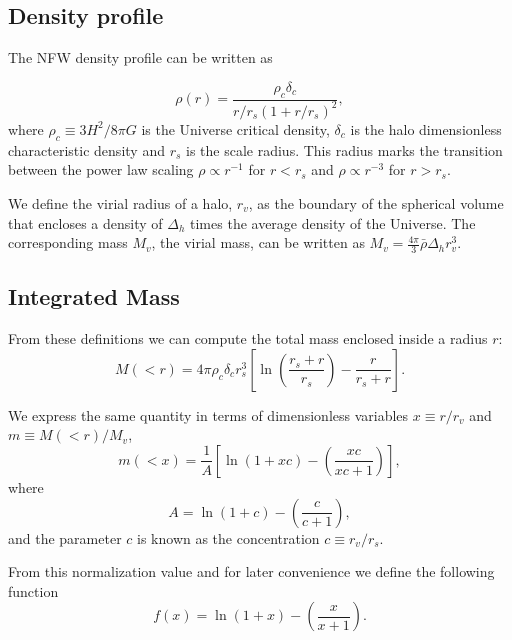 \documentclass{emulateapj}
\begin{document}
\subsection{Density profile}

The NFW density profile can be written as

\begin{equation}
\rho(r) = \frac{\rho_c\delta_c}{r/r_s(1+r/r_s)^2},
\label{eq:definition}
\end{equation}
%
where $\rho_c\equiv 3H^2/8\pi G$ is the Universe critical density,
$\delta_c$ is the halo dimensionless characteristic density and $r_s$
is the scale radius. This radius marks the transition
between the power law scaling $\rho\propto r^{-1}$ for
$r<r_s$ and $\rho\propto r^{-3}$ for  $r>r_s$.

We define the virial radius of a halo, $r_v$, as the boundary of the
spherical volume that encloses a density of $\Delta_h$ times
the average density of the Universe. 
The corresponding mass $M_{v}$, the virial mass, can be written as
$M_{v} = \frac{4\pi}{3}\bar{\rho}\Delta_h r_v^3$.


\subsection{Integrated Mass}
From these definitions we can compute the total mass enclosed inside a
radius $r$:
\begin{equation}
M(<r) = 4\pi\rho_c\delta_c  r_s^3\left[\ln \left
  (\frac{r_s+r}{r_s}\right) - \frac{r}{r_s+r}\right].
\end{equation}

We express the same quantity in terms of dimensionless
variables $x\equiv r/r_v$ and $m\equiv M(<r)/M_v$,
%
\begin{equation}
m(<x) =
\frac{1}{A}\left[\ln\left(1+xc\right)-\left(\frac{xc}{xc+1}\right)\right],
\label{eq:profile}
\end{equation}
%
where
%
\begin{equation}
A=\ln\left(1+c\right)-\left(\frac{c}{c+1}\right),
\end{equation}
%
and the parameter $c$ is known as the concentration $c\equiv r_v/r_s$.

From this normalization value and for later convenience we define the
following function
%
\begin{equation}
f(x) = \ln\left(1+x\right)-\left(\frac{x}{x+1}\right).
\label{eq:f_NFW}
\end{equation}
%
\end{document}
